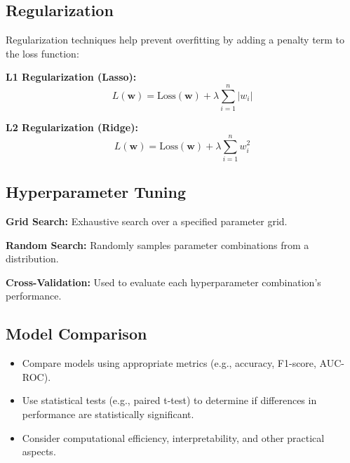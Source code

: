 \subsection*{Regularization}

Regularization techniques help prevent overfitting by adding a penalty term to the loss function:

\textbf{L1 Regularization (Lasso):}
$$L(\mathbf{w}) = \text{Loss}(\mathbf{w}) + \lambda \sum_{i=1}^n |w_i|$$

\textbf{L2 Regularization (Ridge):}
$$L(\mathbf{w}) = \text{Loss}(\mathbf{w}) + \lambda \sum_{i=1}^n w_i^2$$

\subsection*{Hyperparameter Tuning}

\textbf{Grid Search:} Exhaustive search over a specified parameter grid.

\textbf{Random Search:} Randomly samples parameter combinations from a distribution.

\textbf{Cross-Validation:} Used to evaluate each hyperparameter combination's performance.

\subsection*{Model Comparison}

\begin{itemize}
    \item Compare models using appropriate metrics (e.g., accuracy, F1-score, AUC-ROC).
    \item Use statistical tests (e.g., paired t-test) to determine if differences in performance are statistically significant.
    \item Consider computational efficiency, interpretability, and other practical aspects.
\end{itemize}
